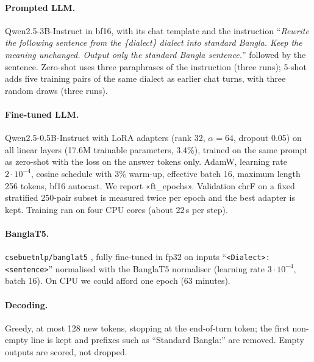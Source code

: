 \documentclass[10pt,twocolumn]{article}
\begin{document}
\paragraph{Prompted LLM.} Qwen2.5-3B-Instruct \cite{qwen} in bf16, with its chat template and the
instruction ``\emph{Rewrite the following sentence from the \{dialect\} dialect into standard Bangla. Keep the
meaning unchanged. Output only the standard Bangla sentence.}'' followed by the sentence. Zero-shot uses three
paraphrases of the instruction (three runs); 5-shot adds five training pairs of the same dialect as earlier
chat turns, with three random draws (three runs).

\paragraph{Fine-tuned LLM.} Qwen2.5-0.5B-Instruct with LoRA adapters (rank 32, $\alpha=64$, dropout 0.05) on
all linear layers (17.6M trainable parameters, 3.4\%), trained on the same prompt as zero-shot with the loss
on the answer tokens only. AdamW, learning rate $2\cdot10^{-4}$, cosine schedule with 3\% warm-up,
effective batch 16, maximum length 256 tokens, bf16 autocast. We report «ft_epochs». Validation chrF on a fixed
stratified 250-pair subset is measured twice per epoch and the best adapter is kept. Training ran on four CPU
cores (about 22\,s per step).

\paragraph{BanglaT5.} \texttt{csebuetnlp/banglat5} \cite{banglat5}, fully fine-tuned in fp32 on inputs
``\texttt{<Dialect>: <sentence>}'' normalised with the BanglaT5 normaliser (learning rate $3\cdot10^{-4}$,
batch 16). On CPU we could afford one epoch (63 minutes).

\paragraph{Decoding.} Greedy, at most 128 new tokens, stopping at the end-of-turn token; the first non-empty
line is kept and prefixes such as ``Standard Bangla:'' are removed. Empty outputs are scored, not dropped.
\end{document}
